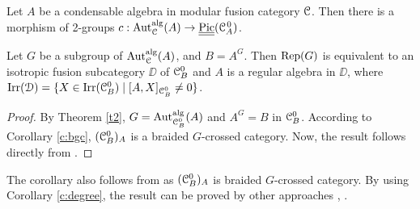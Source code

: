 \documentclass{amsart}
\begin{document}
\begin{cor} \label{c:Pic2}
    Let $A$ be a condensable algebra in modular fusion category ${\EuScript{C}}$. Then there is a morphism of 2-groups $c : {\operatorname{Aut}_{\EuScript{C}}^{\operatorname{alg}}}(A) \to \underline{\underline{\rm Pic}}({{\EuScript{C}}_A^{\hspace{1pt}0}}) $. \qedhere
\end{cor}
\begin{cor}\label{c:regular}
    Let $G$ be a subgroup of  ${\operatorname{Aut}_{\EuScript{C}}^{\operatorname{alg}}}(A)$, and $B = A^G$. Then $\operatorname{Rep}(G)$ is equivalent to an isotropic fusion subcategory $\DD$ of ${{\EuScript{C}}_B^0}$ and $A$ is a regular algebra in $\DD$, where $\operatorname{Irr}({\EuScript{D}}) = \{X \in \operatorname{Irr}({{\EuScript{C}}_B^0})\mid [A, X]_{{{\EuScript{C}}_B^0}} \ne 0\}$. 
\end{cor}
\begin{proof}
   By Theorem \ref{t2}, $G= {\rm Aut}^{\operatorname{alg}}_{{{\EuScript{C}}_B^0}}(A)$ and $A^G = B$ in ${{\EuScript{C}}_B^0}$. According to Corollary \ref{c:bgc}, $({{\EuScript{C}}_B^0})_A$ is a braided $G$-crossed category. Now, the result follows directly from \cite[Thms. 2.11 and 2.15]{Ki2002}.
\end{proof}
 The corollary also follows from \cite[Thm.4.44]{DGNOI} as $({{\EuScript{C}}_B^0})_A$ is braided $G$-crossed category. By using Corollary \ref{c:degree}, the result can be proved by other approaches  \cite[Theorem 9]{DM2021}, \cite[Theorem 6.1]{DNR2025}. 
 
\end{document}
